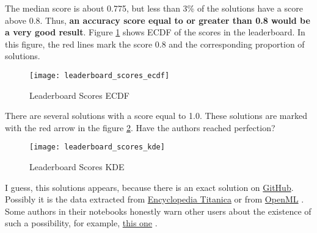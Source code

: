 The median score is about 0.775, but less than 3\% of the solutions have 
a score above 0.8. Thus, \textbf{an accuracy score equal to or greater 
than 0.8 would be a very good result}. Figure \ref{pic:leaderboard_scores_ecdf}
shows ECDF of the scores in the leaderboard. In this figure, the red 
lines mark the score 0.8 and the corresponding proportion of solutions.

\begin{figure}[!ht]
	\centering
	\texttt{[image: leaderboard\_scores\_ecdf]}
	\caption{Leaderboard Scores ECDF}
	\label{pic:leaderboard_scores_ecdf}
\end{figure}

There are several solutions with a score equal to 1.0. These solutions 
are marked with the red arrow in the figure \ref{pic:leaderboard_scores_kde}. 
Have the authors reached perfection?

\begin{figure}[!ht]
	\centering
	\texttt{[image: leaderboard\_scores\_kde]}
	\caption{Leaderboard Scores KDE}
	\label{pic:leaderboard_scores_kde}
\end{figure}

I guess, this solutions appears, because there is an exact solution on
\href{https://github.com/thisisjasonjafari/my-datascientise-handcode/raw/master/005-datavisualization/titanic.csv}
{GitHub}. Possibly it is the data extracted from 
\href{https://www.encyclopedia-titanica.org/titanic-survivors/}
{Encyclopedia Titanica} \cite{encyclopedia_titanica} or from
\href{https://www.openml.org/search?type=data&sort=runs&id=40945&status=active}
{OpenML} \cite{openml_titanic}. Some authors in their notebooks honestly warn 
other users about the existence of such a possibility, for example, 
\href{https://www.kaggle.com/code/suzukifelipe/how-to-be-a-top-lb-explained-for-beginners/notebook?scriptVersionId=99817039}{this one}
\cite{perfection_explanation}.



